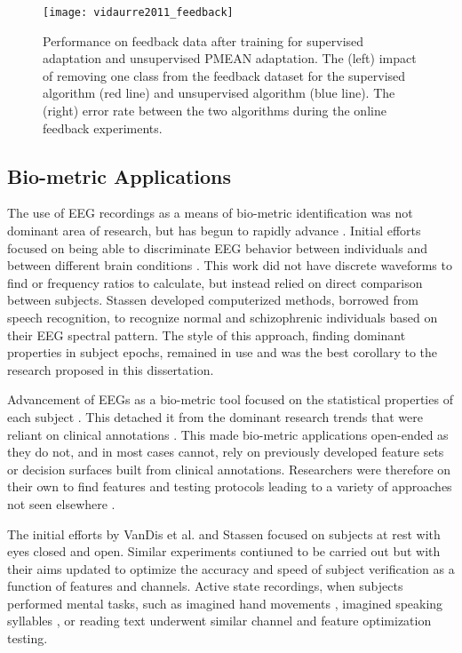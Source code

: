 \begin{figure}[ht]
\centering
\texttt{[image: vidaurre2011\_feedback]}
\caption[BCI Feedback Error]{Performance on feedback data after training for supervised adaptation and unsupervised \ac{PMEAN} adaptation. The (left) impact of removing one class from the feedback dataset for the supervised algorithm (red line) and unsupervised algorithm (blue line). The (right) error rate between the two algorithms during the online feedback experiments.}
\label{fig:vidaurre2011_feedback}
\end{figure}

\subsection{Bio-metric Applications}

The use of \ac{EEG} recordings as a means of bio-metric identification was not dominant area of research, but has begun to rapidly advance \cite{Delpozo-Banos2015}. Initial efforts focused on being able to discriminate \ac{EEG} behavior between individuals and between different brain conditions \cite{VanDis1979}. This work did not have discrete waveforms to find or frequency ratios to calculate, but instead relied on direct comparison between subjects. Stassen \cite{Stassen1980} developed computerized methods, borrowed from speech recognition, to recognize normal and schizophrenic individuals based on their \ac{EEG} spectral pattern. The style of this approach, finding dominant properties in subject epochs, remained in use \cite{DelPozo-Banos2014a} and was the best corollary to the research proposed in this dissertation.

Advancement of \acp{EEG} as a bio-metric tool focused on the statistical properties of each subject \cite{Delpozo-Banos2015}. This detached it from the dominant research trends that were reliant on clinical annotations \cite{Marcel2007a}. This made bio-metric applications open-ended as they do not, and in most cases cannot, rely on previously developed feature sets or decision surfaces built from clinical annotations. Researchers were therefore on their own to find features and testing protocols leading to a variety of approaches not seen elsewhere \cite{VanBeijsterveldt2002,Rocca2013,Rodrigues2016,Ruiz-blondet2016,Nguyen2013}.

The initial efforts by VanDis et al.\cite{VanDis1979} and Stassen \cite{Stassen1980} focused on subjects at rest with eyes closed and open. Similar experiments contiuned to be carried out \cite{Rocca2012,Rocca2014,Rocca2013} but with their aims updated to optimize the accuracy and speed of subject verification as a function of features and channels. Active state recordings, when subjects performed mental tasks, such as imagined hand movements \cite{Fraschini2015,Marcel2007a}, imagined speaking syllables \cite{Brigham2010}, or reading text\cite{Gui2015} underwent similar channel and feature optimization testing.


